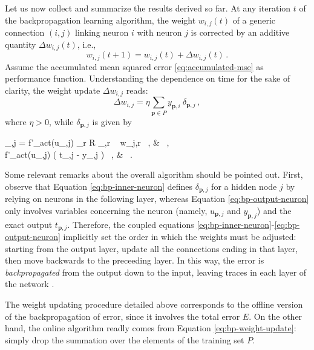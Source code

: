 \documentclass[12pt, a4paper, twoside, openright]{report}
\numberwithin{equation}{chapter}
\theoremstyle{theorem}
\theoremstyle{definition}
\theoremstyle{remark}
\theoremstyle{proposition}
\numberwithin{figure}{chapter}
\begin{document}
		Let us now collect and summarize the results derived so far. At any iteration $t$ of the backpropagation learning algorithm, the weight $w_{i,j}(t)$ of a generic connection $(i,j)$ linking neuron $i$ with neuron $j$ is corrected by an additive quantity $\Delta w_{i,j}(t)$, i.e., 
		\begin{equation*}
			w_{i,j}(t+1) = w_{i,j}(t) + \Delta w_{i,j}(t) \, .
		\end{equation*}
		Assume the accumulated mean squared error \eqref{eq:accumulated-mse} as performance function. Understanding the dependence on time for the sake of clarity, the weight update $\Delta w_{i,j}$ reads:
		\begin{equation*}
			\Delta w_{i,j} = \eta \sum_{\mathbf{p} \in P} y_{\mathbf{p},i} ~ \delta_{\mathbf{p},j} \, ,
		\end{equation*}
		where $\eta > 0$, while $\delta_{\mathbf{p},j}$ is given by
		\begin{subnumcases}{\delta_{,j} =}
			\label{eq:bp-inner-neuron}
		   	f'_{act}(u_{,j}) \sum_{r \in R} \delta_{,r} ~ w_{j,r} \, , &  \, , \\
		   	\label{eq:bp-output-neuron}
			 f'_{act}(u_{,j}) \left( t_{,j} - y_{,j} \right) \, , &  \, .
		\end{subnumcases}
				
		Some relevant remarks about the overall algorithm should be pointed out. First, observe that Equation \eqref{eq:bp-inner-neuron} defines $\delta_{\mathbf{p},j}$ for a hidden node $j$ by relying on neurons in the following layer, whereas Equation \eqref{eq:bp-output-neuron} only involves variables concerning the neuron (namely, $u_{\mathbf{p},j}$ and $y_{\mathbf{p},j}$) and the exact output $t_{\mathbf{p},j}$. Therefore, the coupled equations \eqref{eq:bp-inner-neuron}-\eqref{eq:bp-output-neuron} implicitly set the order in which the weights must be adjusted: starting from the output layer, update all the connections ending in that layer, then move backwards to the preceeding layer. In this way, the error is \emph{backpropagated} from the output down to the input, leaving traces in each layer of the network \cite{Kri, WH60}.
		
		The weight updating procedure detailed above corresponds to the offline version of the backpropagation of error, since it involves the total error $E$. On the other hand, the online algorithm readly comes from Equation \eqref{eq:bp-weight-update}: simply drop the summation over the elements of the training set $P$.
		
\end{document}

